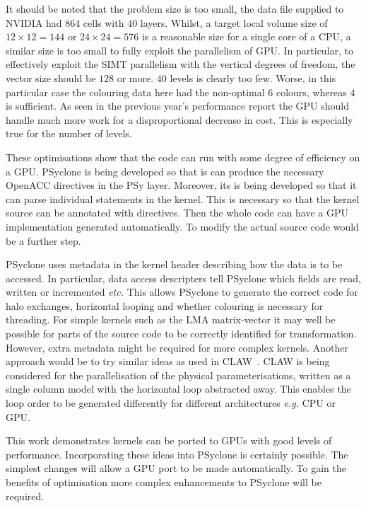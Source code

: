 It should be noted that the problem size is too small, the data file
supplied to NVIDIA had $864$ cells with $40$ layers. Whilst, a target
local volume size of $12\times 12=144$ or $24\times 24=576$ is a
reasonable size for a single core of a CPU, a similar size is too
small to fully exploit the parallelism of GPU. In particular, to
effectively exploit the SIMT parallelism with the vertical degrees of
freedom, the vector size should be $128$ or more. $40$ levels is
clearly too few. Worse, in this particular case the colouring data here
had the non-optimal $6$ colours, whereas $4$ is sufficient. As seen in
the previous year's performance report the GPU should handle much more
work for a disproportional decrease in cost. This is especially true
for the number of levels.

These optimisations show that the code can run with some degree of
efficiency on a GPU. PSyclone is being developed so that is can
produce the necessary OpenACC directives in the PSy layer. Moreover,
its is being developed so that it can parse individual statements in
the kernel. This is necessary so that the kernel source can be
annotated with directives. Then the whole code can have a GPU
implementation generated automatically. To modify the actual source
code would be a further step. 

PSyclone uses metadata in the kernel header describing how the data is
to be accessed. In particular, data access descripters tell PSyclone
which fields are read, written or incremented {\em etc.} This allows
PSyclone to generate the correct code for halo exchanges, horizontal
looping and whether colouring is necessary for threading. For simple
kernels such as the LMA matrix-vector it may well be possible for
parts of the source code to be correctly identified for
transformation. However, extra metadata might be required for more
complex kernels. Another approach would be to try similar ideas as
used in CLAW~\cite{claw}. CLAW is being considered for the parallelisation of the physical
parameterisations, written as a single column model with the
horizontal loop abstracted away. This enables the loop order to be
generated differently for different architectures {\em e.g.} CPU or
GPU.

This work demonstrates kernels can be ported to GPUs with good levels
of performance. Incorporating these ideas into PSyclone is certainly
possible. The simplest changes will allow a GPU port to be made
automatically. To gain the benefits of optimisation more complex
enhancements to PSyclone will be required.  


